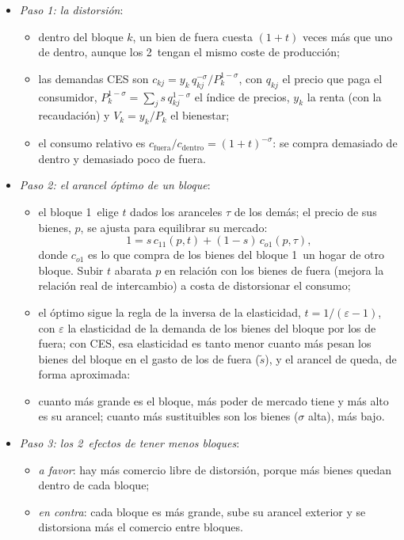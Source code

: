 \documentclass[11pt]{article}
\begin{document}
\begin{itemize}
\item \emph{Paso 1: la distorsión}:
  \begin{itemize}
  \item dentro del bloque $k$, un bien de fuera cuesta $(1+t)$ veces más que uno de dentro, aunque los 2~tengan el mismo coste de producción;
  \item las demandas CES son $c_{kj}=y_k\,q_{kj}^{-\sigma}/P_k^{1-\sigma}$, con $q_{kj}$ el precio que paga el consumidor, $P_k^{1-\sigma}=\sum_j s\,q_{kj}^{1-\sigma}$ el índice de precios, $y_k$ la renta (con la recaudación) y $V_k=y_k/P_k$ el bienestar;
  \item el consumo relativo es $c_{\text{fuera}}/c_{\text{dentro}}=(1+t)^{-\sigma}$: se compra demasiado de dentro y demasiado poco de fuera.
  \end{itemize}
\item \emph{Paso 2: el arancel óptimo de un bloque}:
  \begin{itemize}
  \item el bloque 1~elige $t$ dados los aranceles $\tau$ de los demás; el precio de sus bienes, $p$, se ajusta para equilibrar su mercado:
    $$1=s\,c_{11}(p,t)+(1-s)\,c_{o1}(p,\tau),$$
    donde $c_{o1}$ es lo que compra de los bienes del bloque 1~un hogar de otro bloque. Subir $t$ abarata $p$ en relación con los bienes de fuera (mejora la relación real de intercambio) a costa de distorsionar el consumo;
  \item el óptimo sigue la regla de la inversa de la elasticidad, $t=1/(\varepsilon-1)$, con $\varepsilon$ la elasticidad de la demanda de los bienes del bloque por los de fuera; con CES, esa elasticidad es tanto menor cuanto más pesan los bienes del bloque en el gasto de los de fuera ($\tilde s$), y el arancel de  queda, de forma aproximada:
  \item cuanto más grande es el bloque, más poder de mercado tiene y más alto es su arancel; cuanto más sustituibles son los bienes ($\sigma$ alta), más bajo.
  \end{itemize}
\item \emph{Paso 3: los 2~efectos de tener menos bloques}:
  \begin{itemize}
  \item \emph{a favor}: hay más comercio libre de distorsión, porque más bienes quedan dentro de cada bloque;
  \item \emph{en contra}: cada bloque es más grande, sube su arancel exterior y se distorsiona más el comercio entre bloques.

\end{itemize}
\end{itemize}
\end{document}

